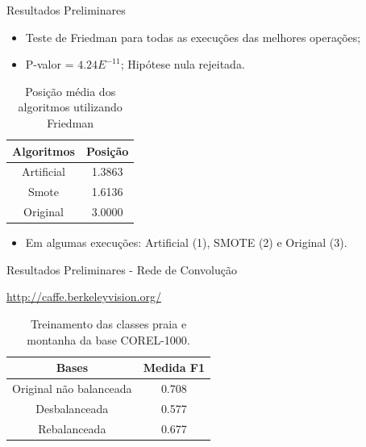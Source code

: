 \documentclass{beamer}
\begin{document}
\begin{frame}{Resultados Preliminares}
\setlength\leftmargini{0em}
\justifying
\begin{itemize}
\item Teste de Friedman para todas as execuções das melhores operações;
\item P-valor = $4.24E^{-11}$; Hipótese nula rejeitada.
\end{itemize}
\begin{table}[htb]
\centering
\caption{Posição média dos algoritmos utilizando Friedman}
  \begin{tabular}{c|c}
    Algoritmos  &   Posição \\ \hline
    Artificial  &   1.3863  \\
    Smote       &   1.6136  \\
    Original    &   3.0000  \\
  \end{tabular}
\end{table}
\begin{itemize}
\item Em algumas execuções: Artificial (1), SMOTE (2) e Original (3).
\end{itemize}
\end{frame}
\begin{frame}{Resultados Preliminares - Rede de Convolução}
\begin{table}
\url{http://caffe.berkeleyvision.org/}
\caption{Treinamento das classes praia e montanha da base COREL-1000.}
  \begin{tabular}{c|c}
    Bases    &   Medida F1 \\ \hline
    Original não balanceada     &   0.708  \\
    Desbalanceada &   0.577  \\
    Rebalanceada  &   0.677  \\
  \end{tabular}
\end{table}
\end{frame}
\end{document}

